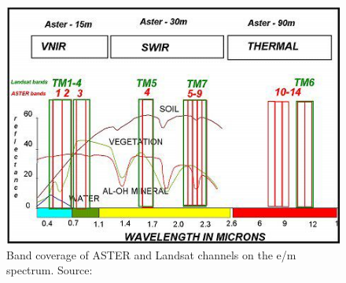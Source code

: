 \documentclass[10pt, a4paper]{article}
\begin{document}
\begin{figure}
	\centering
	\includegraphics[scale=0.35]{Fig-13.jpg}
 	\caption{Band coverage of ASTER and Landsat channels on the e/m spectrum. Source:\cite{Kalinowski04}\label{Kalinowski04}}
	\label{fig:2.4}
\end{figure}
\end{document}
